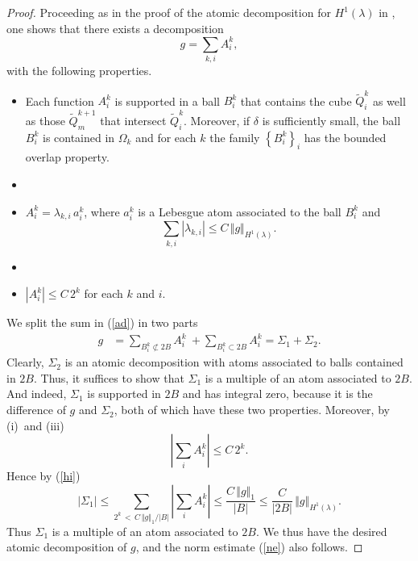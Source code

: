 \documentclass{amsart}                 %
\numberwithin{equation}{section}
\newcommand\set[1]{{\left\{#1\right\}}}
\renewcommand\mod[1]{\left\vert{#1}\right\vert}
\newcommand\norm[2]{{\Vert{#1}\Vert_{#2}}}
\newcommand\1{{\bf 1}}
\newcommand\rmi{\hbox{\rm (i)}}
\newcommand\rmii{\hbox{\rm (ii)}}
\newcommand\rmiii{\hbox{\rm (iii)}}
\begin{document}
\begin{proof}
Proceeding as in the proof of the 
atomic decomposition for $H^1(\lambda)$ in \cite[p. 107--109]{St2}, 
one  shows that there exists a decomposition
\begin{equation}\label{ad}
g=\sum_{k,i} A^k_i,
\end{equation} 
with the following properties.
\begin{itemize}
\item[\rmi] Each function $A^k_i$ is supported in a ball $B^k_i$ that contains 
the cube $\tilde{Q}^k_i$ as well as those $\tilde{Q}^{k+1}_m$ that 
intersect $\tilde{Q}^k_i$. 
Moreover,  if $\delta$ is sufficiently small, the ball $B^k_i$ is 
contained in $\Omega_k$ and for each $k$ the family $\set{B^k_i}_i$ 
has the bounded overlap property.
\item[]
\item[\rmii]  $A^k_i=\lambda_{k,i} \,a^k_i$, where $a^k_i$  is 
a Lebesgue atom associated to the ball $B^k_i$ and 
$$\sum_{k,i} \mod{\lambda_{k,i}}\le C\, \norm{g}{H^1(\lambda)}.
$$
\item[]
\item[\rmiii] $\mod{A^k_i}\le C\,2^k$ for each $k$ and $i$.

\end{itemize}
 We split the sum in (\ref{ad}) in two parts
\begin{align*}
g&=\sum_{B^k_i\not\subset 2B}A^k_i\ +\sum_{B^k_i\subset 
2B} A^k_i
=\Sigma_1+\Sigma_2. 
\end{align*}
Clearly, $\Sigma_2$ is an atomic decomposition with atoms 
associated to  balls contained in $2B$. Thus, it suffices to show that $ 
\Sigma_1$ is a multiple of
an atom associated to $2B$. And indeed, $\Sigma_1$ is supported in $2B
$ and has integral zero, because it is the difference of $g$ and $
\Sigma_2$, both of which have these two properties.
Moreover, by \rmi\   and  \rmiii\  
$$
\mod{\sum_i A^k_i}\le C\,2^k.
$$
   Hence by (\ref{hi})
$$
\mod{\Sigma_1}\le\sum_{ 2^k \,<\,C\,\norm{g}{1}/\mod{B}}\mod
{\sum_i A^k_i}\le \frac{C\,\norm{g}{1}}{\mod{B}}\le \frac{C}{\mod
{2B}}\,\norm{g}{H^1(\lambda)}.
$$
Thus $\Sigma_1$ is a multiple of an atom associated 
to $2B$. We thus have the desired atomic decomposition of $g$, and 
the norm estimate (\ref{ne}) also follows.
\end{proof}
\end{document}
